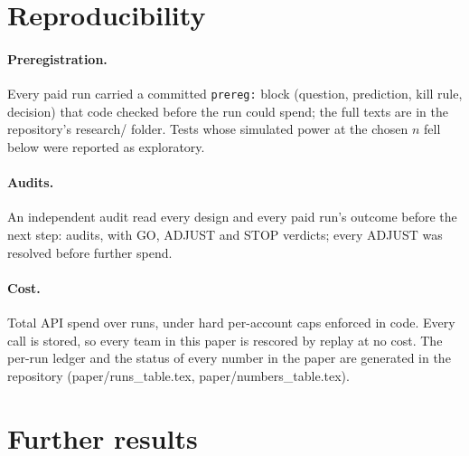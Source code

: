 \documentclass{article}
\begin{document}



\appendix

\section{Reproducibility}
\label{app:repro}

\paragraph{Preregistration.} Every paid run carried a committed \texttt{prereg:} block (question, prediction, kill rule,
decision) that code checked before the run could spend; the full texts are in the repository's research/ folder.
Tests whose simulated power at the chosen $n$ fell below  were reported as exploratory.

\paragraph{Audits.} An independent audit read every design and every paid run's outcome before the next step:
 audits, with  GO,  ADJUST and  STOP verdicts; every
ADJUST was resolved before further spend.

\paragraph{Cost.} Total API spend  over  runs, under hard per-account caps enforced in
code. Every call is stored, so every team in this paper is rescored by replay at no cost. The per-run ledger and the
status of every number in the paper are generated in the repository (paper/runs\_table.tex, paper/numbers\_table.tex).

\section{Further results}
\label{app:more}
\end{document}
